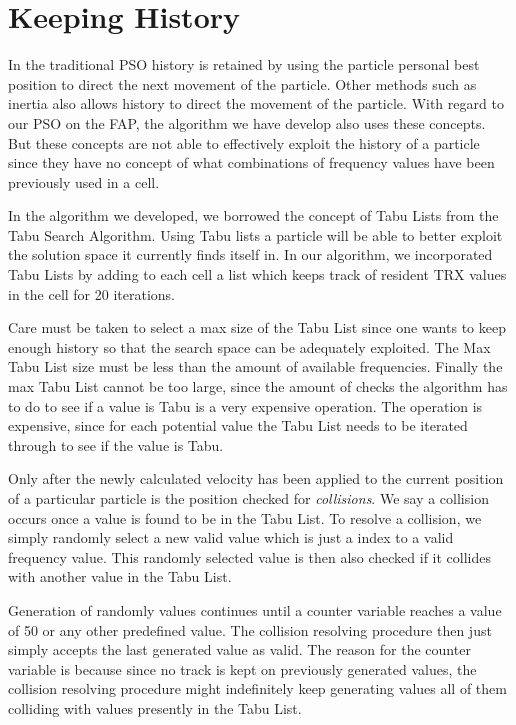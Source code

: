 \section{Keeping History}
In the traditional PSO history is retained by using the particle personal best position to direct the next movement of the particle. Other methods such as inertia also allows history to direct the movement of the particle. With regard to our PSO on the FAP, the algorithm we have develop also uses these concepts. But these concepts are not able to effectively exploit the history of a particle since they have no concept of what combinations of frequency values have been previously used in a cell.

In the algorithm we developed, we borrowed the concept of Tabu Lists from the Tabu Search Algorithm. Using Tabu lists a particle will be able to better exploit the solution space it currently finds itself in. In our algorithm, we incorporated Tabu Lists by adding to each cell a list which keeps track of resident TRX values in the cell for 20 iterations.

Care must be taken to select a max size of the Tabu List since one wants to keep enough history so that the search space can be adequately exploited. The Max Tabu List size must be less than the amount of available frequencies. Finally the max Tabu List cannot be too large, since the amount of checks the algorithm has to do to see if a value is Tabu is a very expensive operation. The operation is expensive, since for each potential value the Tabu List needs to be iterated through to see if the value is Tabu.

Only after the newly calculated velocity has been applied to the current position of a particular particle is the position checked for \emph{collisions}. We say a collision occurs once a value is found to be in the Tabu List. To resolve a collision, we simply randomly select a new valid value which is just a index to a valid frequency value. This randomly selected value is then also checked if it collides with another value in the Tabu List. 

Generation of randomly values continues until a counter variable reaches a value of 50 or any other predefined value. The collision resolving procedure then just simply accepts the last generated value as valid. The reason for the counter variable is because since no track is kept on previously generated values, the collision resolving procedure might indefinitely keep generating values all of them colliding with values presently in the Tabu List.

